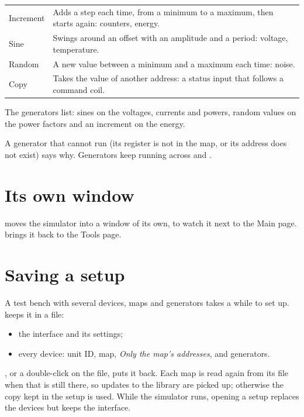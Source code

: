 \begin{center}
\begin{tabularx}{\linewidth}{l L}
  \toprule
   &  \\
  \midrule
  Increment & Adds a step each time, from a minimum to a maximum, then starts
    again: counters, energy. \\
  Sine & Swings around an offset with an amplitude and a period: voltage,
    temperature. \\
  Random & A new value between a minimum and a maximum each time: noise. \\
  Copy & Takes the value of another address: a status input that follows a
    command coil. \\
  \bottomrule
\end{tabularx}
\end{center}

  {The generators list: sines on the voltages, currents and powers, random
   values on the power factors and an increment on the energy.}

A generator that cannot run (its register is not in the map, or its address
does not exist) says why. Generators keep running across  and
.

\section{Its own window}

 moves the simulator into a window of its own, to watch it next to
the Main page.  brings it back to the Tools page.

\section{Saving a setup}
\label{sec:sim-setups}

A test bench with several devices, maps and generators takes a while to set
up.  keeps it in a  file:

\begin{itemize}
  \item the interface and its settings;
  \item every device: unit ID, map, \emph{Only the map's addresses}, and
        generators.
\end{itemize}

, or a double-click on the file, puts it back. Each map is read
again from its file when that is still there, so updates to the library are
picked up; otherwise the copy kept in the setup is used. While the simulator
runs, opening a setup replaces the devices but keeps the interface.

